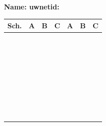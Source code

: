 \documentclass{article}
\begin{document}
{\Large\bf Name: \hspace{2.5in}    uwnetid:}\\
\renewcommand\arraystretch{1.7}%
\begin{tabular}{|p{.5in}|p{0.8in}|p{0.8in}|p{0.8in}||p{0.8in}|p{0.8in}|p{0.8in}|}
\hline
Sch.    & A & B & C & A & B & C \\ \hline
        &   &   &   &   &   &   \\ \hline
        &   &   &   &   &   &   \\ \hline
        &   &   &   &   &   &   \\ \hline
        &   &   &   &   &   &   \\ \hline
        &   &   &   &   &   &   \\ \hline
        &   &   &   &   &   &   \\ \hline
        &   &   &   &   &   &   \\ \hline
        &   &   &   &   &   &   \\ \hline
        &   &   &   &   &   &   \\ \hline
        &   &   &   &   &   &   \\ \hline
        &   &   &   &   &   &   \\ \hline
        &   &   &   &   &   &   \\ \hline
        &   &   &   &   &   &   \\ \hline
        &   &   &   &   &   &   \\ \hline
        &   &   &   &   &   &   \\ \hline
        &   &   &   &   &   &   \\ \hline
        &   &   &   &   &   &   \\ \hline
        &   &   &   &   &   &   \\ \hline
        &   &   &   &   &   &   \\ \hline
        &   &   &   &   &   &   \\ \hline
        &   &   &   &   &   &   \\ \hline
        &   &   &   &   &   &   \\ \hline
        &   &   &   &   &   &   \\ \hline
        &   &   &   &   &   &   \\ \hline
        &   &   &   &   &   &   \\ \hline
        &   &   &   &   &   &   \\ \hline
        &   &   &   &   &   &   \\ \hline
        &   &   &   &   &   &   \\ \hline
        &   &   &   &   &   &   \\ \hline
        &   &   &   &   &   &   \\ \hline
        &   &   &   &   &   &   \\ \hline
        &   &   &   &   &   &   \\ \hline
        &   &   &   &   &   &   \\ \hline
        &   &   &   &   &   &   \\ \hline
\end{tabular}
\newpage
\end{document}
